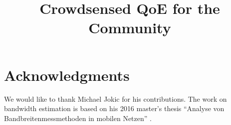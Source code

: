 \documentclass[conference,10pt,a4paper]{IEEEtran}
\begin{document}
\title{Crowdsensed QoE for the Community}



\author{
\and
{}
}

\maketitle









\section*{Acknowledgments}
We would like to thank Michael Jokic for his contributions. The work on bandwidth estimation is based on his 2016 master's thesis ``Analyse von Bandbreitenmessmethoden in mobilen Netzen'' \cite{jokic16mobileBW}.

\balance
\printbibliography
\end{document}
